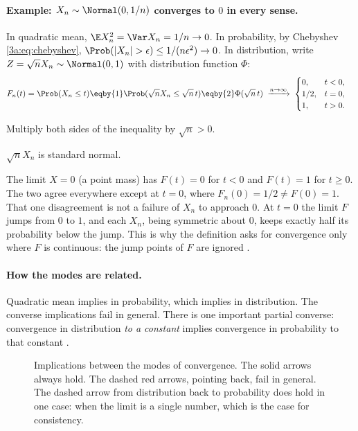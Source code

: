 \paragraph{Example: $X_n\sim\Normal(0,1/n)$ converges to $0$ in every sense.}
\label{3a:ex:squeeze}
In quadratic mean, $\E X_n^2=\Var X_n=1/n\to0$. In probability, by
Chebyshev \eqref{3a:eq:chebyshev}, $\Prob(|X_n|>\epsilon)\le1/(n\epsilon^2)\to0$.
In distribution, write $Z=\sqrt n X_n\sim\Normal(0,1)$ with distribution
function $\Phi$:
\begin{align*}
  F_n(t)=\Prob(X_n\le t)
  &\eqby{1} \Prob(\sqrt n X_n\le\sqrt n\,t)
   \eqby{2} \Phi(\sqrt n\,t)
   \;\xrightarrow{n\to\infty}\;
   \begin{cases}0,& t<0,\\ 1/2,& t=0,\\ 1,& t>0.\end{cases}
\end{align*}
\begin{explain}
  \item Multiply both sides of the inequality by $\sqrt n>0$.
  \item $\sqrt nX_n$ is standard normal.
\end{explain}
The limit $X=0$ (a point mass) has $F(t)=0$ for $t<0$ and $F(t)=1$ for
$t\ge0$. The two agree everywhere except at $t=0$, where
$F_n(0)=1/2\neq F(0)=1$. That one disagreement is not a failure of $X_n$ to
approach $0$. At $t=0$ the limit $F$ jumps from $0$ to $1$, and each $X_n$,
being symmetric about $0$, keeps exactly half its probability below the
jump. This is why the definition asks for convergence only where $F$ is
continuous: the jump points of $F$ are ignored .

\paragraph{How the modes are related.}
Quadratic mean implies in probability, which implies in distribution. The
converse implications fail in general. There is one important partial
converse: convergence in distribution \emph{to a constant} implies
convergence in probability to that constant .

\begin{figure}[htbp]
\centering
{}
\caption{Implications between the modes of convergence. The solid arrows
always hold. The dashed red arrows, pointing back, fail in general. The
dashed arrow from distribution back to probability does hold in one case:
when the limit is a single number, which is the case for consistency.}
\label{3a:fig:modes}
\end{figure}


